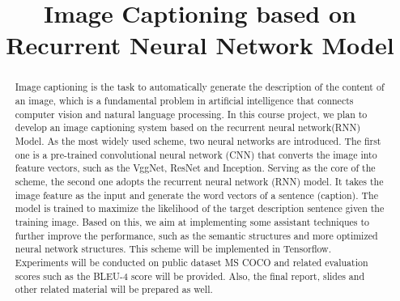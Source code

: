 \documentclass[conference]{IEEEtran}
\begin{document}
\title{Image Captioning based on Recurrent Neural Network Model}

\author{
\and
{}
\and
{}
}

\maketitle

\begin{abstract}
Image captioning is the task to automatically generate the description of the content of an image, which is a fundamental problem in artificial intelligence that connects computer vision and natural language processing. In this course project, we plan to develop an image captioning system based on the recurrent neural network(RNN) Model. As the most widely used scheme, two neural networks are introduced. The first one is a pre-trained convolutional neural network (CNN) that converts the image into feature vectors, such as the VggNet, ResNet and Inception. Serving as the core of the scheme, the second one adopts the recurrent neural network (RNN) model. It takes the image feature as the input and generate the word vectors of a sentence (caption). The model is trained to maximize the likelihood of the target description sentence given the training image. Based on this, we aim at implementing some assistant techniques to further improve the performance, such as the semantic structures and more optimized neural network structures. This scheme will be implemented in Tensorflow. Experiments will be conducted on public dataset MS COCO and related evaluation scores such as the BLEU-4 score will be provided. Also, the final report, slides and other related material will be prepared as well.
\end{abstract}
\end{document}
